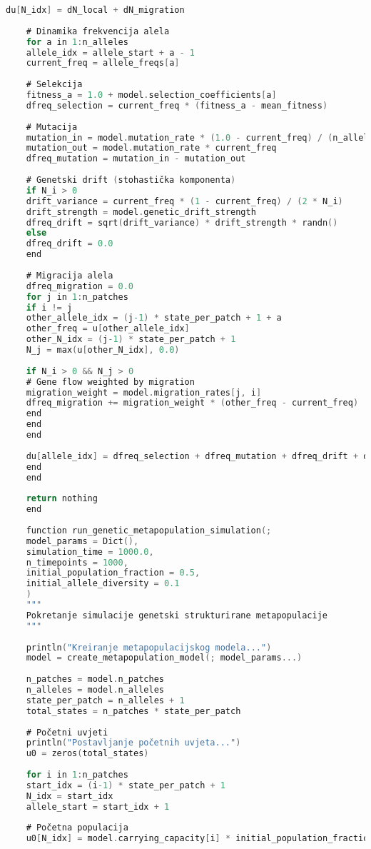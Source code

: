 \documentclass[11pt,oneside]{book}
\begin{document}
\begin{lstlisting}[language=C, caption=Julia implementacija genetski strukturiranog metapopulacijskog modela]
	du[N_idx] = dN_local + dN_migration
	
	# Dinamika frekvencija alela
	for a in 1:n_alleles
	allele_idx = allele_start + a - 1
	current_freq = allele_freqs[a]
	
	# Selekcija
	fitness_a = 1.0 + model.selection_coefficients[a]
	dfreq_selection = current_freq * (fitness_a - mean_fitness)
	
	# Mutacija
	mutation_in = model.mutation_rate * (1.0 - current_freq) / (n_alleles - 1)
	mutation_out = model.mutation_rate * current_freq
	dfreq_mutation = mutation_in - mutation_out
	
	# Genetski drift (stohastička komponenta)
	if N_i > 0
	drift_variance = current_freq * (1 - current_freq) / (2 * N_i)
	drift_strength = model.genetic_drift_strength
	dfreq_drift = sqrt(drift_variance) * drift_strength * randn()
	else
	dfreq_drift = 0.0
	end
	
	# Migracija alela
	dfreq_migration = 0.0
	for j in 1:n_patches
	if i != j
	other_allele_idx = (j-1) * state_per_patch + 1 + a
	other_freq = u[other_allele_idx]
	other_N_idx = (j-1) * state_per_patch + 1
	N_j = max(u[other_N_idx], 0.0)
	
	if N_i > 0 && N_j > 0
	# Gene flow weighted by migration
	migration_weight = model.migration_rates[j, i]
	dfreq_migration += migration_weight * (other_freq - current_freq)
	end
	end
	end
	
	du[allele_idx] = dfreq_selection + dfreq_mutation + dfreq_drift + dfreq_migration
	end
	end
	
	return nothing
	end
	
	function run_genetic_metapopulation_simulation(;
	model_params = Dict(),
	simulation_time = 1000.0,
	n_timepoints = 1000,
	initial_population_fraction = 0.5,
	initial_allele_diversity = 0.1
	)
	"""
	Pokretanje simulacije genetski strukturirane metapopulacije
	"""
	
	println("Kreiranje metapopulacijskog modela...")
	model = create_metapopulation_model(; model_params...)
	
	n_patches = model.n_patches
	n_alleles = model.n_alleles
	state_per_patch = n_alleles + 1
	total_states = n_patches * state_per_patch
	
	# Početni uvjeti
	println("Postavljanje početnih uvjeta...")
	u0 = zeros(total_states)
	
	for i in 1:n_patches
	start_idx = (i-1) * state_per_patch + 1
	N_idx = start_idx
	allele_start = start_idx + 1
	
	# Početna populacija
	u0[N_idx] = model.carrying_capacity[i] * initial_population_fraction
	

\end{lstlisting}
\end{document}
